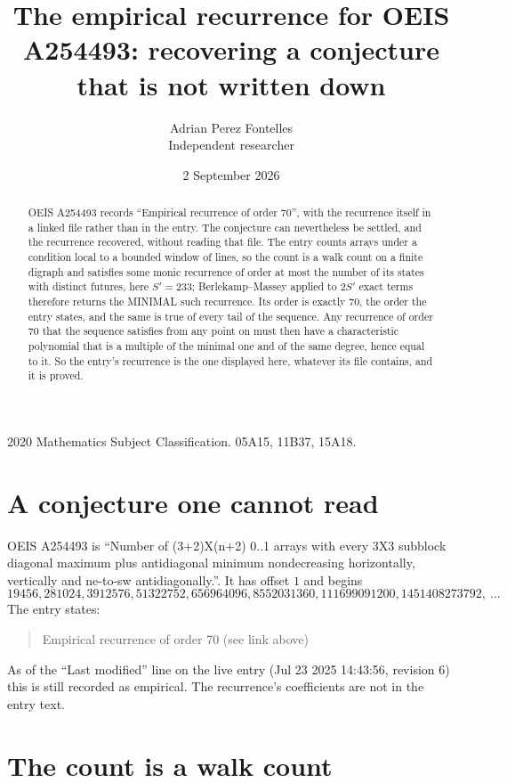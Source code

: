 \documentclass[11pt,a4paper]{article}
\title{The empirical recurrence for OEIS A254493: recovering a conjecture that is not written down}
\author{Adrian Perez Fontelles\\ \small Independent researcher}
\date{2 September 2026}
\theoremstyle{plain}
\theoremstyle{definition}
\begin{document}
\maketitle

\begin{abstract}
OEIS A254493 records ``Empirical recurrence of order $70$'', with the recurrence itself in a
linked file rather than in the entry. The conjecture can nevertheless be settled, and the
recurrence recovered, without reading that file. The entry counts arrays under a condition
local to a bounded window of lines, so the count is a walk count on a finite digraph and
satisfies some monic recurrence of order at most the number of its states with distinct
futures, here $S'=233$; Berlekamp--Massey applied to $2S'$ exact
terms therefore returns the MINIMAL such recurrence. Its order is exactly $70$, the order
the entry states, and the same is true of every tail of the sequence. Any recurrence of order
$70$ that the sequence satisfies from any point on must then have a characteristic
polynomial that is a multiple of the minimal one and of the same degree, hence equal to it. So
the entry's recurrence is the one displayed here, whatever its file contains, and it is
proved.
\end{abstract}

\noindent\small 2020 Mathematics Subject Classification. 05A15, 11B37, 15A18.\normalsize

\section{A conjecture one cannot read}

OEIS A254493 is ``Number of (3+2)X(n+2) 0..1 arrays with every 3X3 subblock diagonal maximum plus antidiagonal minimum nondecreasing horizontally, vertically and ne-to-sw antidiagonally.''. It has offset $1$ and begins
\[
19456, 281024, 3912576, 51322752, 656964096, 8552031360, 111699091200, 1451408273792,\ \dots
\]
The entry states:
\begin{quote}
Empirical recurrence of order 70 (see link above)
\end{quote}
As of the ``Last modified'' line on the live entry (Jul 23 2025 14:43:56, revision 6) this is still
recorded as empirical. The recurrence's coefficients are not in the entry text.

\section{The count is a walk count}
\end{document}
